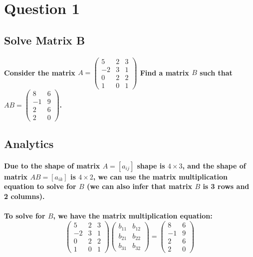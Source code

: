 \section{Question 1}
\subsection{Solve Matrix B}
\paragraph{Consider the matrix $ A =
        \begin{pmatrix}
            5  & 2 & 3 \\
            -2 & 3 & 1 \\
            0  & 2 & 2 \\
            1  & 0 & 1
        \end{pmatrix} $ Find a matrix $B$ such that $AB =
        \begin{pmatrix}
            8  & 6 \\
            -1 & 9 \\
            2  & 6 \\
            2  & 0
        \end{pmatrix}$.
}
\subsection{Analytics}
\paragraph{Due to the shape of matrix $A=[a_{ij}]$ shape is \(4\times 3\), and the shape of matrix $AB=[a_{ik}]$ is \(4\times 2\), we can use the matrix multiplication equation to solve for \(B\) (we can also infer that matrix $B$ is 3 rows and 2 columns).}
\paragraph{To solve for \(B\), we have the matrix multiplication equation:
    $$
        \begin{pmatrix}
            5  & 2 & 3 \\
            -2 & 3 & 1 \\
            0  & 2 & 2 \\
            1  & 0 & 1
        \end{pmatrix}
        \begin{pmatrix}
            b_{11} & b_{12} \\
            b_{21} & b_{22} \\
            b_{31} & b_{32}
        \end{pmatrix}
        =
        \begin{pmatrix}
            8  & 6 \\
            -1 & 9 \\
            2  & 6 \\
            2  & 0
        \end{pmatrix}
    $$}
